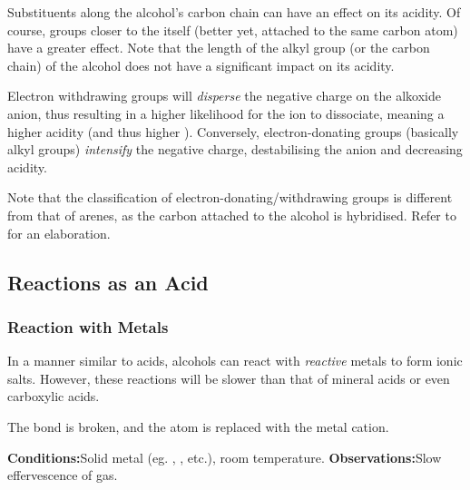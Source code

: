 				Substituents along the alcohol's carbon chain can have an effect on its acidity. Of course, groups closer to the 
				itself (better yet, attached to the same carbon atom) have a greater effect. Note that the length of the alkyl group
				(or the carbon chain) of the alcohol does not have a significant impact on its acidity.

				Electron withdrawing groups will \textit{disperse} the negative charge on the alkoxide anion, thus resulting in a higher
				likelihood for the  ion to dissociate, meaning a higher acidity (and thus higher \Ka). Conversely, electron-donating
				groups (basically alkyl groups) \textit{intensify} the negative charge, destabilising the anion and decreasing acidity.

				Note that the classification of electron-donating/withdrawing groups is different from that of arenes, as the carbon
				attached to the alcohol is \spthree hybridised. Refer to \hyperlink{CaveatResonanceTable}{} for an
				elaboration.



		\pagebreak
		\subsection{Reactions as an Acid}

			\subsubsection{Reaction with Metals}
				In a manner similar to acids, alcohols can react with \textit{reactive} metals to form ionic salts. However, these reactions
				will be slower than that of mineral acids or even carboxylic acids.

				The  bond is broken, and the  atom is replaced with the metal cation.


				\vspace{1.5em}
				\vbox{\textbf{Conditions:}\tabto{35mm}Solid metal (eg. , , etc.), room temperature.}
				\vbox{\textbf{Observations:}\tabto{35mm}Slow effervescence of  gas.}


